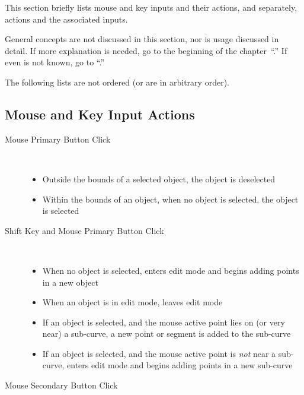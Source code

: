 	This section briefly lists mouse and key
	inputs and their actions, and
	separately, actions and the associated inputs.

	General concepts are not discussed in this section,
	nor is usage discussed in detail. If more explanation
	is needed, go to the beginning of the
	chapter~``.''
	If even \IXpov{} is not known, go to
	``.''
	
	The following lists are not ordered (or are in
	arbitrary order).
	
		\subsection{Mouse and Key Input Actions}%
		\label{ssec:input_to_action}

		\begin{description}
		  \item[Mouse Primary Button Click] \hfill \\
		    \begin{itemize}
		      \item Outside the bounds of a selected object, the
		        object is deselected
		      \item Within the bounds of an object, when no object
		        is selected, the object is selected
		    \end{itemize}
		  \item[Shift Key and Mouse Primary Button Click] \hfill \\
		    \begin{itemize}
		      \item When no
		        object is selected, enters edit mode and
		        begins adding points in a
		        new object
		      \item When an
		        object is in edit mode,
		        leaves edit mode
		      \item If an object is selected, and the mouse active
		        point lies on (or very near) a sub-curve, a
		        new point or segment is added to the sub-curve
		      \item If an object is selected, and the mouse active
		        point is \emph{not} near a sub-curve, enters edit mode
		        and begins adding points in a new sub-curve
		    \end{itemize}
		  \item[Mouse Secondary Button Click] \hfill \\
		    \begin{itemize}

\end{itemize}
\end{description}
